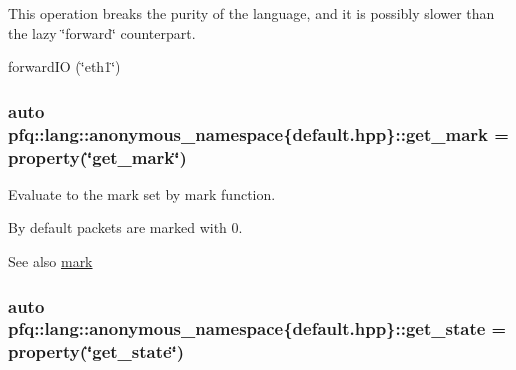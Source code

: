This operation breaks the purity of the language, and it is possibly slower than the lazy \char`\"{}forward\char`\"{} counterpart.

forward\+IO (\char`\"{}eth1\char`\"{}) 
\subsubsection[{\texorpdfstring{get\+\_\+mark}{get_mark}}]{\setlength{\rightskip}{0pt plus 5cm}auto pfq\+::lang\+::anonymous\+\_\+namespace\{default.\+hpp\}\+::get\+\_\+mark = {\bf property}(\char`\"{}get\+\_\+mark\char`\"{})}\hypertarget{namespacepfq_1_1lang_1_1anonymous__namespace_02default_8hpp_03_ab733e24b3ca86450bea0b0888a6327d2}{}\label{namespacepfq_1_1lang_1_1anonymous__namespace_02default_8hpp_03_ab733e24b3ca86450bea0b0888a6327d2}


Evaluate to the mark set by {\ttfamily mark} function. 

By default packets are marked with 0.

\begin{DoxySeeAlso}{See also}
\hyperlink{namespacepfq_1_1lang_1_1anonymous__namespace_02default_8hpp_03_a7b831baeabda070b89ca862a9445a4a8}{mark} 
\end{DoxySeeAlso}
\subsubsection[{\texorpdfstring{get\+\_\+state}{get_state}}]{\setlength{\rightskip}{0pt plus 5cm}auto pfq\+::lang\+::anonymous\+\_\+namespace\{default.\+hpp\}\+::get\+\_\+state = {\bf property}(\char`\"{}get\+\_\+state\char`\"{})}\hypertarget{namespacepfq_1_1lang_1_1anonymous__namespace_02default_8hpp_03_acd2598e95a0ebc3c21e84f9c861d0d98}{}\label{namespacepfq_1_1lang_1_1anonymous__namespace_02default_8hpp_03_acd2598e95a0ebc3c21e84f9c861d0d98}


